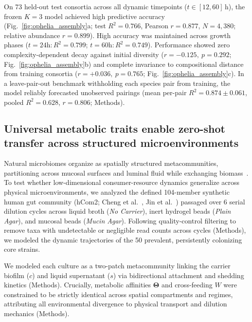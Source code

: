 On 73 held-out test consortia across all dynamic timepoints ($t \in [12, 60]$\,h), the frozen $K=3$ model achieved high predictive accuracy (Fig.~\ref{fig:ophelia_assembly}a; test $R^2 = 0.766$, Pearson $r = 0.877$, $N = 4,380$; relative abundance $r = 0.899$). High accuracy was maintained across growth phases ($t = 24\text{h}: R^2 = 0.799$; $t = 60\text{h}: R^2 = 0.749$). Performance showed zero complexity-dependent decay against initial diversity ($r = -0.125,\ p = 0.292$; Fig.~\ref{fig:ophelia_assembly}b) and complete invariance to compositional distance from training consortia ($r = +0.036,\ p = 0.765$; Fig.~\ref{fig:ophelia_assembly}c). In a leave-pair-out benchmark withholding each species pair from training, the model reliably forecasted unobserved pairings (mean per-pair $R^2 = 0.874 \pm 0.061$, pooled $R^2 = 0.628$, $r = 0.806$; Methods).

\subsection{Universal metabolic traits enable zero-shot transfer across structured microenvironments}
\label{subsec:pollard}

Natural microbiomes organize as spatially structured metacommunities, partitioning across mucosal surfaces and luminal fluid while exchanging biomass~\cite{jin2023culturing}. To test whether low-dimensional consumer-resource dynamics generalize across physical microenvironments, we analyzed the defined 104-member synthetic human gut community (hCom2; Cheng et al.~\cite{cheng2022design}, Jin et al.~\cite{jin2023culturing}) passaged over 6 serial dilution cycles across liquid broth (\textit{No Carrier}), inert hydrogel beads (\textit{Plain Agar}), and mucosal beads (\textit{Mucin Agar}). Following quality-control filtering to remove taxa with undetectable or negligible read counts across cycles (Methods), we modeled the dynamic trajectories of the 50 prevalent, persistently colonizing core strains.

We modeled each culture as a two-patch metacommunity linking the carrier biofilm ($c$) and liquid supernatant ($s$) via bidirectional attachment and shedding kinetics (Methods). Crucially, metabolic affinities $\mathbf{\Theta}$ and cross-feeding $W$ were constrained to be strictly identical across spatial compartments and regimes, attributing all environmental divergence to physical transport and dilution mechanics (Methods).

